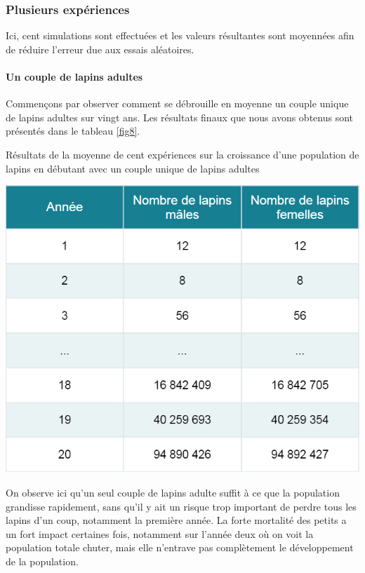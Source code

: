 \documentclass[12pt]{article}
\begin{document}
    \subsubsection{Plusieurs expériences}
    \par
    Ici, cent simulations sont effectuées et les valeurs résultantes sont moyennées afin de réduire l'erreur due aux essais aléatoires.

    \paragraph{Un couple de lapins adultes}\hspace{0.5cm}
    \newline
    \par Commençons par observer comment se débrouille en moyenne un couple unique de lapins adultes sur vingt ans. Les résultats finaux que nous avons obtenus sont présentés dans le tableau \ref{fig8}.
    \newpage
    \begin{table}[!h]
	    \centering
	    \caption{Résultats de la moyenne de cent expériences sur la croissance d'une population de lapins en débutant avec un couple unique de lapins adultes}
        \includegraphics[scale = 0.68]{Photos/mean2Lap.png}
	    \label{fig8}
	\end{table}
    \par
    On observe ici qu'un seul couple de lapins adulte suffit à ce que la population grandisse rapidement, sans qu'il y ait un risque trop important de perdre tous les lapins d'un coup, notamment la première année. La forte mortalité des petits a un fort impact certaines fois, notamment sur l'année deux où on voit la population totale chuter, mais elle n'entrave pas complètement le développement de la population.
\end{document}
